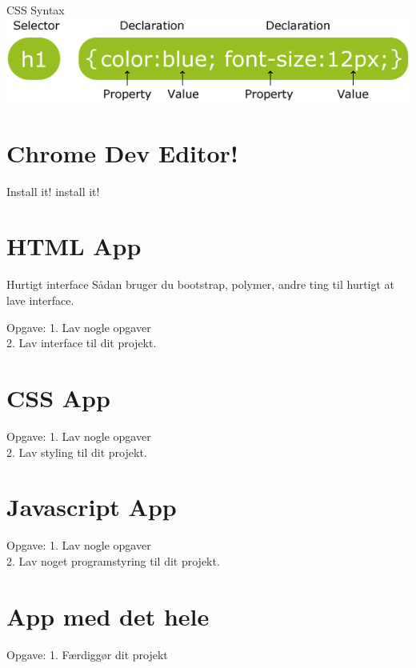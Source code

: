 \documentclass[10pt]{beamer}
\begin{document}
\begin{frame}{CSS Syntax}
		\includegraphics[width=\linewidth]{img/css-syntax.png}
\end{frame}



\section{Chrome Dev Editor!}
\begin{frame}{Install it!}
	install it!
\end{frame}


\section{HTML App}
\begin{frame}{Hurtigt interface}
	Sådan bruger du bootstrap, polymer, andre ting til hurtigt at lave interface.
\end{frame}

\begin{frame}{Opgave:}
	1. Lav nogle opgaver \\
	2. Lav interface til dit projekt.
\end{frame}

\section{CSS App}
\begin{frame}{Opgave:}
	1. Lav nogle opgaver \\
	2. Lav styling til dit projekt.
\end{frame}

\section{Javascript App}
\begin{frame}{Opgave:}
	1. Lav nogle opgaver \\
	2. Lav noget programstyring til dit projekt.
\end{frame}

\section{App med det hele}
\begin{frame}{Opgave:}
	1. Færdiggør dit projekt
\end{frame}


 
\end{document}
